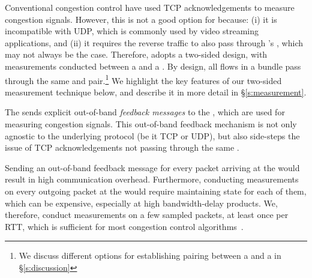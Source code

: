\label{s:design:twosided}
Conventional congestion control  have used TCP acknowledgements to measure congestion signals. However, this is not a good option for \name because: (i) it is incompatible with UDP, which is commonly used by video streaming applications, and (ii) it requires the reverse traffic to also pass through \name's \inbox, which may not always be the case.  
Therefore, \name adopts a two-sided design, with measurements conducted between a \inbox and a \outbox. By design, all flows in a bundle pass through the same \inbox and \outbox pair.\footnote{We discuss different options for establishing pairing between a \inbox and a \outbox in \S\ref{s:discussion}} We highlight the key features of our two-sided measurement technique below, and describe it in more detail in \S\ref{s:measurement}. 

The \outbox sends explicit out-of-band \emph{feedback messages} to the \inbox, which are used for measuring congestion signals. 
This out-of-band feedback mechanism is not only agnostic to the underlying protocol (be it TCP or UDP), but also side-steps the issue of TCP acknowledgements not passing through the same \inbox. 

 Sending an out-of-band feedback message for every packet arriving at the \outbox would result in high communication overhead. Furthermore, conducting measurements on every outgoing packet at the \inbox would require maintaining state for each of them, which can be expensive, especially at high bandwidth-delay products. We, therefore, conduct measurements on a few sampled packets, at least once per RTT, which is sufficient for most congestion control algorithms~\cite{ccp}. 

